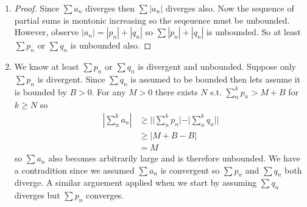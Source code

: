 \begin{enumerate}[label=(\alph*)]
    \item 

    \begin{proof}
        Since $\sum a_n$ diverges then $\sum |a_n|$
        diverges also. Now the sequence of partial sums is montonic increasing
        so the seqeuence must be unbounded. However, observe
        $|a_n| = |p_n| + |q_n|$ so $\sum |p_n| + |q_n|$ is unbounded. 
        So at least $\sum p_n$ or $\sum q_n$ is unbounded also.
    \end{proof}

    \item 
    We know at least $\sum p_n$ or $\sum q_n$ is divergent and unbounded.
    Suppose only $\sum p_n$ is divergent. Since $\sum q_n$ is assumed to be
    bounded then lets assume it is bounded by $B>0$. For any $M>0$ there exists
    $N$ s.t. $\sum_n^k p_n > M+B$ for $k\geq N$ so
    \begin{align*}
        |\sum_n^k a_n| &\geq ||\sum_n^k p_n| - |\sum_n^k q_n|| \\
        & \geq |M+B - B| \\
        &= M
    \end{align*}
    so $\sum a_n$ also becomes arbitrarily large and is therefore unbounded. We
    have a contradition since we assumed $\sum a_n$ is convergent so $\sum p_n$
    and $\sum q_n$ both diverge. A similar arguement applied when we start by 
    assuming $\sum q_n$ diverges but $\sum p_n$ converges. 
\end{enumerate}

